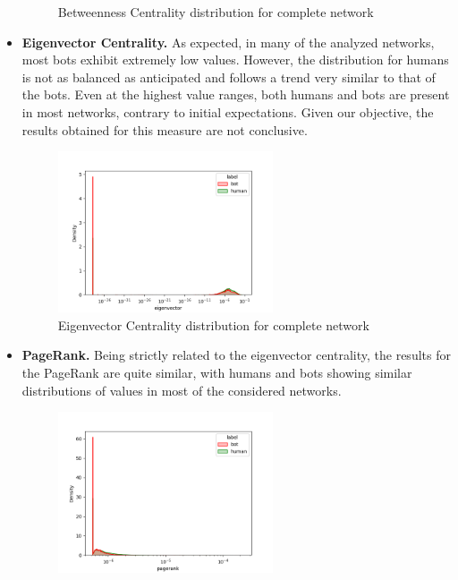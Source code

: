 \documentclass[12pt, a4paper]{article}
\begin{document}
\begin{itemize}
\begin{figure}[H]
                    \caption{Betweenness Centrality distribution for complete network}
                    \label{fig:betweenness}
                \end{figure}
			\item \textbf{Eigenvector Centrality.} As expected, in many of the analyzed networks, most bots exhibit extremely low values. However, the distribution for humans is not as balanced as anticipated and follows a trend very similar to that of the bots. Even at the highest value ranges, both humans and bots are present in most networks, contrary to initial expectations. Given our objective, the results obtained for this measure are not conclusive.
				\begin{figure}[H]
                    \centering
                    \includegraphics[width=0.6\textwidth]{results/complete_eigenvector.png}
                    \caption{Eigenvector Centrality distribution for complete network}
                \end{figure}      
			\item \textbf{PageRank.} Being strictly related to the eigenvector centrality, the results for the PageRank are quite similar, with humans and bots showing similar distributions of values in most of the considered networks.
                \begin{figure}[H]
                    \centering
                    \includegraphics[width=0.6\textwidth]{results/complete_pagerank.png}

\end{figure}
\end{itemize}
\end{document}
